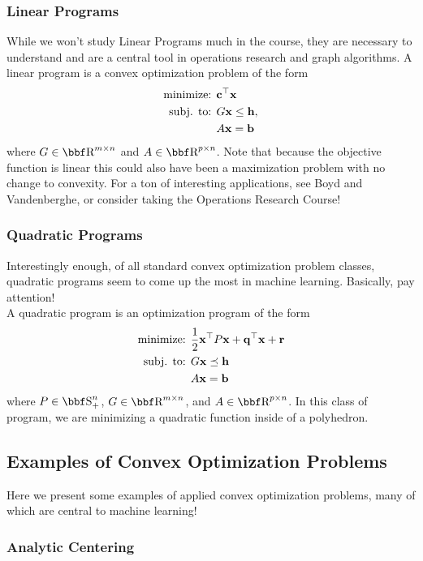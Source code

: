 \documentclass{article}
\begin{document}
\subsubsection{Linear Programs}

While we won't study Linear Programs much in the course, they
are necessary to understand and are a central tool in operations
research and graph algorithms. A linear program is a convex
optimization problem of the form
\begin{align*}
    \text{minimize: } & {\bf c}^\top{\bf x}\\
    \text{subj. to: } & G{\bf x} \leq {\bf h},\\
                      & A{\bf x} = {\bf b}
\end{align*}
where $G\in\RR^{m\times n}$ and $A\in\RR^{p\times n}$. Note that
because the objective function is linear this could also have been
a maximization problem with no change to convexity. For a ton
of interesting applications, see Boyd and Vandenberghe, or consider
taking the Operations Research Course!

\subsubsection{Quadratic Programs}

Interestingly enough, of all standard convex optimization problem classes,
quadratic programs seem to come up the most in machine learning. Basically,
pay attention!\\

A quadratic program is an optimization program of the form
\begin{align*}
    \text{minimize: } & \frac{1}{2}{\bf x}^\top P{\bf x} + {\bf q}^\top{\bf x} + {\bf r}\\
    \text{subj. to: } & G{\bf x} \preceq{\bf h}\\
                      & A{\bf x} = {\bf b}
\end{align*}
where $P\in\SS_+^n$, $G\in\RR^{m\times n}$, and $A\in\RR^{p\times n}$.
In this class of program, we are minimizing a quadratic function inside
of a polyhedron.

\subsection{Examples of Convex Optimization Problems}

Here we present some examples of applied convex optimization
problems, many of which are central to machine learning!

\subsubsection{Analytic Centering}
\end{document}
